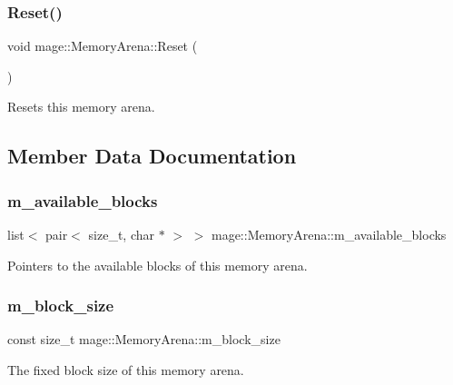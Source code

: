 \subsubsection{\texorpdfstring{Reset()}{Reset()}}
{\footnotesize\ttfamily void mage\+::\+Memory\+Arena\+::\+Reset (\begin{DoxyParamCaption}{ }\end{DoxyParamCaption})}

Resets this memory arena. 

\subsection{Member Data Documentation}
\hypertarget{classmage_1_1_memory_arena_a89c4f1d2b4d5e05bb46fa303d70428c4}{}\label{classmage_1_1_memory_arena_a89c4f1d2b4d5e05bb46fa303d70428c4} 
\subsubsection{\texorpdfstring{m\+\_\+available\+\_\+blocks}{m\_available\_blocks}}
{\footnotesize\ttfamily list$<$ pair$<$ size\+\_\+t, char $\ast$ $>$ $>$ mage\+::\+Memory\+Arena\+::m\+\_\+available\+\_\+blocks\hspace{0.3cm}{\ttfamily [private]}}

Pointers to the available blocks of this memory arena. \hypertarget{classmage_1_1_memory_arena_a18177c245b045c5536330ffed284ed4d}{}\label{classmage_1_1_memory_arena_a18177c245b045c5536330ffed284ed4d} 
\subsubsection{\texorpdfstring{m\+\_\+block\+\_\+size}{m\_block\_size}}
{\footnotesize\ttfamily const size\+\_\+t mage\+::\+Memory\+Arena\+::m\+\_\+block\+\_\+size\hspace{0.3cm}{\ttfamily [private]}}

The fixed block size of this memory arena. \hypertarget{classmage_1_1_memory_arena_ab2d39233b1e64239baea519a2d073b04}{}\label{classmage_1_1_memory_arena_ab2d39233b1e64239baea519a2d073b04} 
